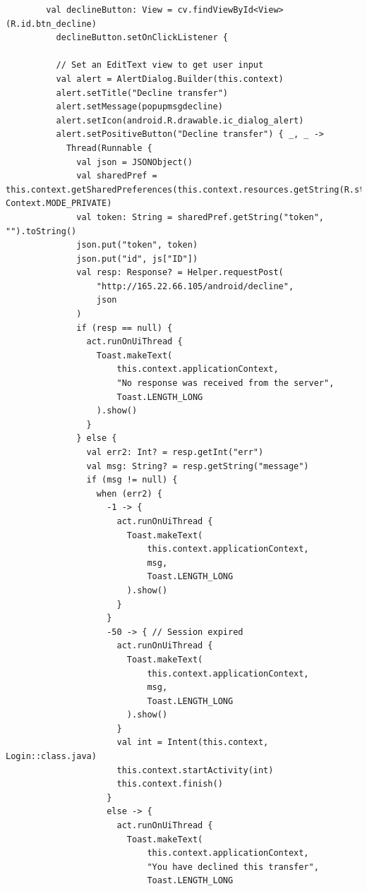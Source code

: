 \documentclass[11pt, a4paper]{article}
\begin{document}
\begin{appendices}
\begin{lstlisting}
        val declineButton: View = cv.findViewById<View>(R.id.btn_decline)
          declineButton.setOnClickListener {

          // Set an EditText view to get user input
          val alert = AlertDialog.Builder(this.context)
          alert.setTitle("Decline transfer")
          alert.setMessage(popupmsgdecline)
          alert.setIcon(android.R.drawable.ic_dialog_alert)
          alert.setPositiveButton("Decline transfer") { _, _ ->
            Thread(Runnable {
              val json = JSONObject()
              val sharedPref = this.context.getSharedPreferences(this.context.resources.getString(R.string.app_name), Context.MODE_PRIVATE)
              val token: String = sharedPref.getString("token", "").toString()
              json.put("token", token)
              json.put("id", js["ID"])
              val resp: Response? = Helper.requestPost(
                  "http://165.22.66.105/android/decline",
                  json
              )
              if (resp == null) {
                act.runOnUiThread {
                  Toast.makeText(
                      this.context.applicationContext,
                      "No response was received from the server",
                      Toast.LENGTH_LONG
                  ).show()
                }
              } else {
                val err2: Int? = resp.getInt("err")
                val msg: String? = resp.getString("message")
                if (msg != null) {
                  when (err2) {
                    -1 -> {
                      act.runOnUiThread {
                        Toast.makeText(
                            this.context.applicationContext,
                            msg,
                            Toast.LENGTH_LONG
                        ).show()
                      }
                    }
                    -50 -> { // Session expired
                      act.runOnUiThread {
                        Toast.makeText(
                            this.context.applicationContext,
                            msg,
                            Toast.LENGTH_LONG
                        ).show()
                      }
                      val int = Intent(this.context, Login::class.java)
                      this.context.startActivity(int)
                      this.context.finish()
                    }
                    else -> {
                      act.runOnUiThread {
                        Toast.makeText(
                            this.context.applicationContext,
                            "You have declined this transfer",
                            Toast.LENGTH_LONG

\end{lstlisting}
\end{appendices}
\end{document}
